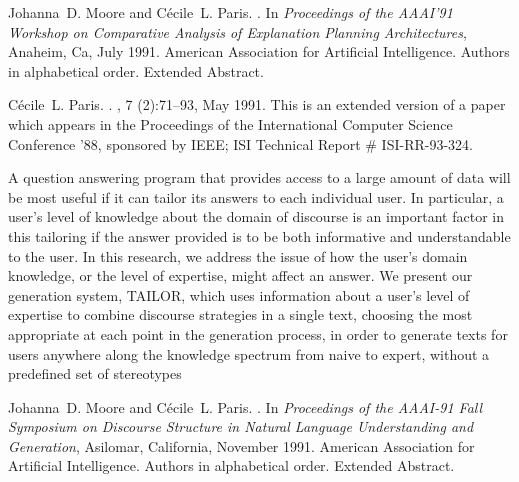 \begin{thebibliography}{10}
Johanna~D. Moore and C{\'e}cile~L. Paris.
.
\newblock In {\em {Proceedings of the AAAI'91 Workshop on Comparative Analysis
  of Explanation Planning Architectures}}, Anaheim, Ca, July 1991. American
  Association for Artificial Intelligence.
\newblock Authors in alphabetical order. Extended Abstract.

\noindent\hspace*{\itemindent}{\leftskip=0.1in\rightskip=0.1in\hrulefill}

C\'{e}cile~L. Paris.
.
, 7 (2):71--93, May 1991.
\newblock This is an extended version of a paper which appears in the
  Proceedings of the International Computer Science Conference '88, sponsored
  by IEEE; ISI Technical Report \# ISI-RR-93-324.

{\leftskip=0.1in\rightskip=0.1in\begin{small}\par{}A
  question answering program that provides access to a large amount of data
  will be most useful if it can tailor its answers to each individual user. In
  particular, a user's level of knowledge about the domain of discourse is an
  important factor in this tailoring if the answer provided is to be both
  informative and understandable to the user. In this research, we address the
  issue of how the user's domain knowledge, or the level of expertise, might
  affect an answer. We present our generation system, TAILOR, which uses
  information about a user's level of expertise to combine discourse strategies
  in a single text, choosing the most appropriate at each point in the
  generation process, in order to generate texts for users anywhere along the
  knowledge spectrum from naive to expert, without a predefined set of
  stereotypes\end{small}\par}
\noindent\hspace*{\itemindent}{\leftskip=0.1in\rightskip=0.1in\hrulefill}

Johanna~D. Moore and C\'{e}cile~L. Paris.
.
\newblock In {\em Proceedings of the AAAI-91 Fall Symposium on Discourse
  Structure in Natural Language Understanding and Generation}, Asilomar,
  California, November 1991. American Association for Artificial Intelligence.
\newblock Authors in alphabetical order. Extended Abstract.


\end{thebibliography}
